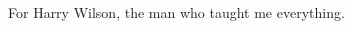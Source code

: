 \cleardoublepage
\thispagestyle{empty} %

\vspace*{8cm}

\hfill
\begin{parbox}{0.6\textwidth}{
        \begin{flushright}

            For Harry Wilson, the man who taught me everything.

        \end{flushright}}
\end{parbox}


